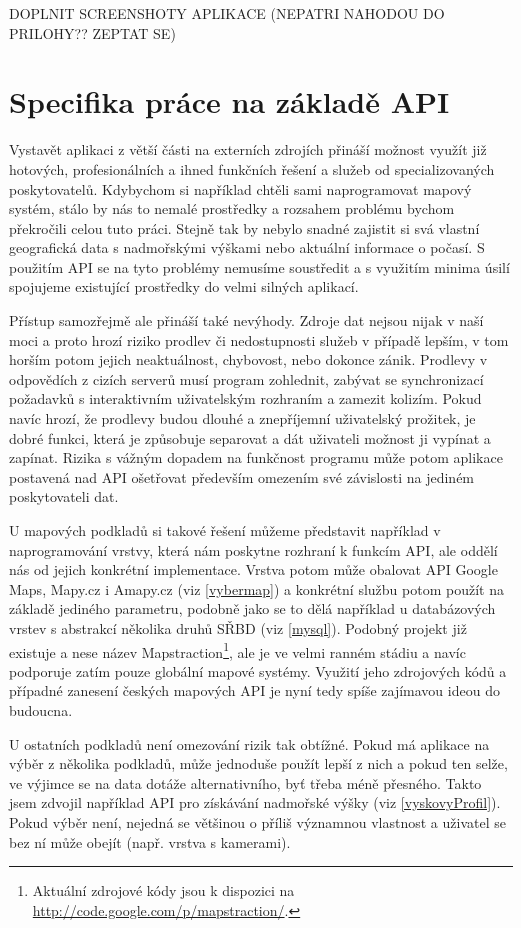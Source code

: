 DOPLNIT SCREENSHOTY APLIKACE (NEPATRI NAHODOU DO PRILOHY?? ZEPTAT SE)

\section{Specifika práce na základě API}
Vystavět aplikaci z větší části na externích zdrojích přináší možnost
využít již hotových, profesionálních a ihned funkčních řešení a služeb
od specializovaných poskytovatelů. Kdybychom si například chtěli sami
naprogramovat mapový systém, stálo by nás to nemalé prostředky a
rozsahem problému bychom překročili celou tuto práci. Stejně tak by
nebylo snadné zajistit si svá vlastní geografická data s nadmořskými
výškami nebo aktuální informace o počasí. S použitím API se na tyto
problémy nemusíme soustředit a s využitím minima úsilí spojujeme
existující prostředky do velmi silných aplikací.

Přístup samozřejmě ale přináší také nevýhody. Zdroje dat nejsou nijak
v naší moci a proto hrozí riziko prodlev či nedostupnosti služeb v
případě lepším, v tom horším potom jejich neaktuálnost, chybovost, nebo
dokonce zánik. Prodlevy v odpovědích z cizích serverů musí program
zohlednit, zabývat se synchronizací požadavků s interaktivním
uživatelským rozhraním a zamezit kolizím. Pokud navíc hrozí, že 
prodlevy budou dlouhé a znepříjemní uživatelský prožitek, je dobré
funkci, která je způsobuje separovat a dát uživateli možnost ji
vypínat a zapínat. Rizika s vážným dopadem na funkčnost programu může
potom aplikace postavená nad API ošetřovat především omezením své
závislosti na jediném poskytovateli dat.

U mapových podkladů si takové řešení můžeme představit například v
naprogramování vrstvy, která nám poskytne rozhraní k funkcím API,
ale oddělí nás od jejich konkrétní implementace. Vrstva potom může
obalovat API Google Maps, Mapy.cz i Amapy.cz (viz \ref{vybermap}) a
konkrétní službu potom použít na základě jediného parametru, podobně
jako se to dělá například u databázových vrstev s abstrakcí
několika druhů SŘBD (viz \ref{mysql}). Podobný projekt již existuje a
nese název Mapstraction\footnote{Aktuální zdrojové kódy jsou k dispozici na
\url{http://code.google.com/p/mapstraction/}.}, ale je ve velmi ranném stádiu a navíc podporuje zatím pouze globální
mapové systémy. Využití jeho zdrojových kódů a případné zanesení českých
mapových API je nyní tedy spíše zajímavou ideou do budoucna.

U ostatních podkladů není omezování rizik tak obtížné. Pokud má
aplikace na výběr z několika podkladů, může jednoduše použít lepší z
nich a pokud ten selže, ve výjimce se na data dotáže alternativního,
byť třeba méně přesného. Takto jsem zdvojil například API pro
získávání nadmořské výšky (viz \ref{vyskovyProfil}). Pokud výběr
není, nejedná se většinou o příliš významnou vlastnost a uživatel se
bez ní může obejít (např. vrstva s kamerami).

